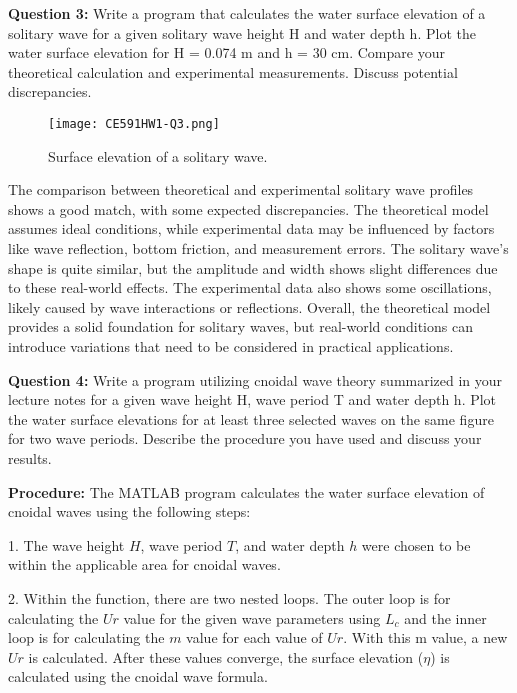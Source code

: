 \documentclass[a4paper]{article}
\begin{document}
\textbf{Question 3:} Write a program that calculates the water surface elevation of a solitary wave for a given solitary wave height H and water depth h. Plot the water surface elevation for H = 0.074 m and h = 30 cm. Compare your theoretical calculation and experimental measurements. Discuss potential discrepancies.
\vspace{0.3cm}

\begin{figure}[H]
    \centering
    \texttt{[image: CE591HW1-Q3.png]}
    \caption{\small Surface elevation of a solitary wave.}
    \label{fig:plot3}
\end{figure} 
\vspace{0.3cm}

The comparison between theoretical and experimental solitary wave profiles shows a good match, with some expected discrepancies. The theoretical model assumes ideal conditions, while experimental data may be influenced by factors like wave reflection, bottom friction, and measurement errors. The solitary wave's shape is quite similar, but the amplitude and width shows slight differences due to these real-world effects. The experimental data also shows some oscillations, likely caused by wave interactions or reflections. Overall, the theoretical model provides a solid foundation for solitary waves, but real-world conditions can introduce variations that need to be considered in practical applications.
\vspace{0.5cm}

\textbf{Question 4:} Write a program utilizing cnoidal wave theory summarized in your lecture notes for a given wave height H, wave period T and water depth h. Plot the water surface elevations for at least three selected waves on the same figure for two wave periods. Describe the procedure you have used and discuss your results.
\vspace{0.3cm}

\textbf{Procedure:} The MATLAB program calculates the water surface elevation of cnoidal waves using the following steps:

1. The wave height \(H\), wave period \(T\), and water depth \(h\) were chosen to be within the applicable area for cnoidal waves.

2. Within the function, there are two nested loops. The outer loop is for calculating the \(Ur\) value for the given wave parameters using \(L_c\) and the inner loop is for calculating the \(m\) value for each value of \(Ur\). With this m value, a new \(Ur\) is calculated. After these values converge, the surface elevation ($\eta$) is calculated using the cnoidal wave formula.
\end{document}
